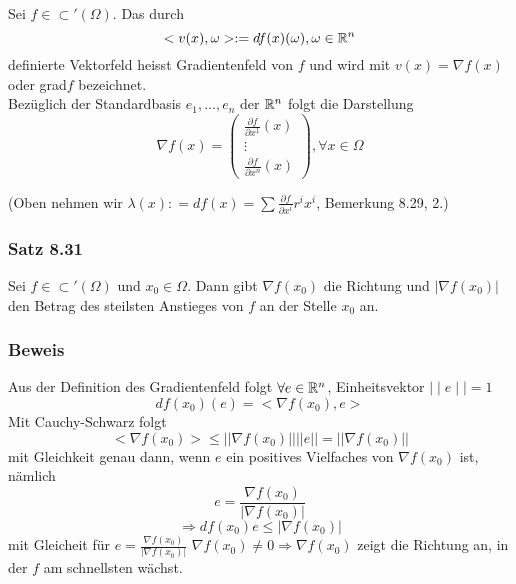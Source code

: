 \begin{definition}{8.30}
Sei $f\in\subset'\left(\Omega\right)$. Das durch \[< v(x),\omega >:=df(x)(\omega ), \omega\in\mathbb{R}^n\] definierte Vektorfeld heisst Gradientenfeld von $f$ und wird mit $v(x)=\nabla f(x)$ oder grad$f$ bezeichnet. \\

Bezüglich der Standardbasis $e_1,\dots, e_n$ der $\mathbb{R}^n$ folgt die Darstellung
\[\nabla f(x) = \left( {\begin{array}{*{20}{c}}
{\frac{{\partial f}}{{\partial {x^1}}}(x)}\\
 \vdots \\
{\frac{{\partial f}}{{\partial {x^n}}}(x)}
\end{array}} \right),\forall x \in \Omega \]
\centerline{(Oben nehmen wir $\lambda (x): = df(x) = \sum {\frac{{\partial f}}{{\partial {x^i}}}{r^i}{x^i}} $, Bemerkung 8.29, 2.)}
\end{definition}
\subsubsection*{Satz 8.31}
Sei $f\in\subset '\left(\Omega\right)$ und $x_0\in\Omega$. Dann gibt $\nabla f\left(x_0\right)$ die Richtung und $\left| \nabla f\left(x_0\right)\right|$ den Betrag des steilsten Anstieges von $f$ an der Stelle $x_0$ an.
\subsubsection*{Beweis}
Aus der Definition des Gradientenfeld folgt $\forall e\in\mathbb{R}^n$, Einheitsvektor $\mid\mid e\mid\mid =1$ \[df\left(x_0\right)\left( e\right)=< \nabla f\left( x_0\right) ,e >\]
Mit Cauchy-Schwarz folgt
\[<\nabla f\left( x_0\right)>\leq\left|\left|\nabla f\left( x_0\right)\right|\right|\left|\left| e\right|\right| = \left|\left| \nabla f\left( x_0\right)\right|\right|\]
mit Gleichkeit genau dann, wenn $e$ ein positives Vielfaches von $\nabla f\left( x_0\right)$ ist, nämlich \[e=\frac{\nabla f\left( x_0\right)}{\left| \nabla f\left( x_0\right)\right|}\] \[\Rightarrow df\left( x_0\right) e \leq \left| \nabla f\left( x_0\right)\right|\]
mit Gleicheit für $e=\frac{\nabla f\left( x_0\right)}{\left| \nabla f\left( x_0\right)\right|}$
$\nabla f\left( x_0\right)\not= 0\Rightarrow \nabla f\left( x_0\right)$ zeigt die Richtung an, in der $f$ am schnellsten wächst.\\

